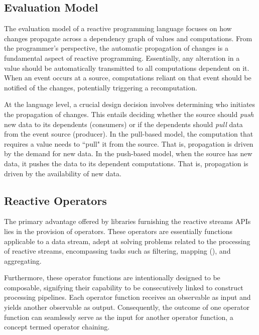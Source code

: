 

\subsection{Evaluation Model}

The evaluation model of a reactive programming language focuses on how changes propagate across a dependency graph of values and computations. From the programmer's perspective, the automatic propagation of changes is a fundamental aspect of reactive programming. Essentially, any alteration in a value should be automatically transmitted to all computations dependent on it. When an event occurs at a source, computations reliant on that event should be notified of the changes, potentially triggering a recomputation.

At the language level, a crucial design decision involves determining who initiates the propagation of changes. This entails deciding whether the source should \textit{push} new data to its dependents (consumers) or if the dependents should \textit{pull} data from the event source (producer). In the pull-based model, the computation that requires a value needs to ``pull" it from the source. That is, propagation is driven by the demand for new data. In the push-based model, when the source has new data, it pushes the data to its dependent computations. That is, propagation is driven by the availability of new data.

\subsection{Reactive Operators}

The primary advantage offered by libraries furnishing the reactive streams APIs lies in the provision of operators. These operators are essentially functions applicable to a data stream, adept at solving problems related to the processing of reactive streams, encompassing tasks such as filtering, mapping (), and aggregating.

Furthermore, these operator functions are intentionally designed to be composable, signifying their capability to be consecutively linked to construct processing pipelines. Each operator function receives an observable as input and yields another observable as output. Consequently, the outcome of one operator function can seamlessly serve as the input for another operator function, a concept termed operator chaining.

